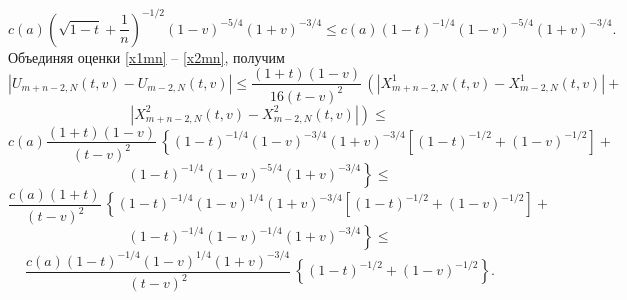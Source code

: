 \documentclass[12pt]{book}
\begin{document}
\begin{equation}\label{x2mn}
    c(a)
    \left(  \sqrt{1-t} + \frac{1}{n} \right)^{-1/2}
    \left(1-v\right)^{-5/4}
    \left(1+v \right)^{-3/4}
    \leq
    c(a)
    \left( 1-t\right)^{-1/4}
    \left(1-v\right)^{-5/4}
    \left(1+v \right)^{-3/4}.
\end{equation}
Объединяя оценки \eqref{x1mn} -- \eqref{x2mn}, получим
\begin{equation*}
\left| U_{m+n-2,N}(t,v) - U_{m-2,N}(t,v) \right| \leq
\frac{(1+t)(1-v)}{16 (t-v)^2}\,
\left(
   \left| X^{1}_{m+n-2,N}(t,v) - X^{1}_{m-2,N}(t,v) \right| +
\right.
\end{equation*}
\begin{equation*}
\left.
   \left| X^{2}_{m+n-2,N}(t,v) - X^{2}_{m-2,N}(t,v) \right|
\right) \leq
\end{equation*}
\begin{equation*}
c(a)\frac{(1+t)(1-v)}{(t-v)^2}\,
\left\{
(1-t)^{-1/4} (1-v)^{-3/4}(1+v)^{-3/4} \left[
    (1-t)^{-1/2} +
    (1-v)^{-1/2}
    \right]
+ \right.
\end{equation*}
\begin{equation*}
\left.
    \left( 1-t\right)^{-1/4}
    \left(1-v\right)^{-5/4}
    \left(1+v \right)^{-3/4}
\right\} \leq
\end{equation*}
\begin{equation*}
\frac{c(a)(1+t)}{(t-v)^2}\,
\left\{
    (1-t)^{-1/4} (1-v)^{1/4}(1+v)^{-3/4} \left[
    (1-t)^{-1/2} +
    (1-v)^{-1/2}
    \right]
+ \right.
\end{equation*}
\begin{equation*}
\left.
    \left(1-t\right)^{-1/4}
    \left(1-v\right)^{-1/4}
    \left(1+v \right)^{-3/4}
\right\} \leq
\end{equation*}
\begin{equation*}
\frac{c(a)(1-t)^{-1/4}(1-v)^{1/4}(1+v)^{-3/4} }{(t-v)^2}\,
\left\{
    (1-t)^{-1/2} +    (1-v)^{-1/2}
\right\}.
\end{equation*}
\end{document}
